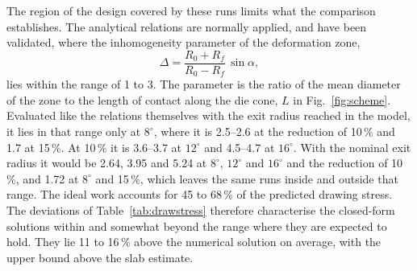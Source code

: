 \documentclass[subscriptcorrection,upint,varvw,barcolor=Goldenrod3,mathalfa=cal=euler,balance,hyphenate,french,pdf-a]{asmejour} %
\begin{document}
The region of the design covered by these runs limits what the comparison establishes. The
analytical relations are normally applied, and have been validated, where the inhomogeneity
parameter of the deformation zone,
\begin{equation}
\Delta = \frac{R_0+R_f}{R_0-R_f}\,\sin\alpha,
\label{eq:delta}
\end{equation}
lies within the range of 1 to 3. The parameter is the ratio of the mean diameter of the zone to
the length of contact along the die cone, $L$ in Fig.~\ref{fig:scheme}. Evaluated like the
relations themselves with the exit radius reached in the model, it lies in that range only at
$8^\circ$, where it is
2.5--2.6 at the reduction of 10\,\% and 1.7 at 15\,\%. At 10\,\% it is 3.6--3.7 at $12^\circ$
and 4.5--4.7 at $16^\circ$. With the nominal exit radius it would be 2.64, 3.95 and 5.24 at
$8^\circ$, $12^\circ$ and $16^\circ$ and the reduction of 10\,\%, and 1.72 at $8^\circ$ and 15\,\%,
which leaves the same runs inside and outside that range.
The ideal work accounts for 45 to 68\,\% of the predicted drawing
stress. The deviations of Table~\ref{tab:drawstress} therefore characterise the closed-form
solutions within and somewhat beyond the range where they are expected to hold. They lie 11 to
16\,\% above the numerical solution on average, with the upper bound above the slab estimate.
\end{document}
